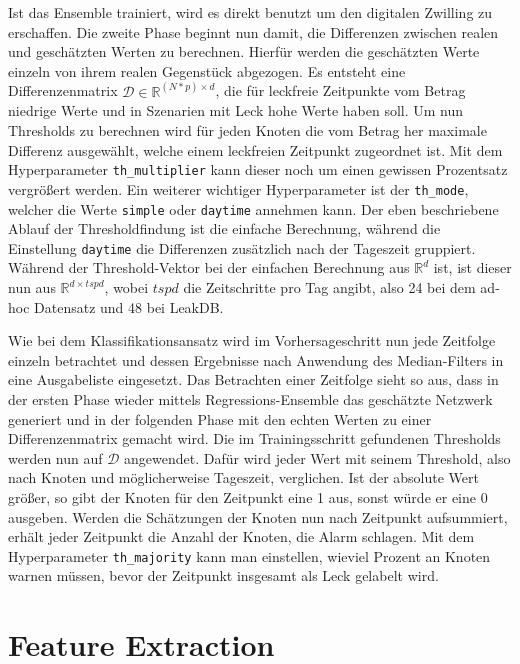 Ist das Ensemble trainiert, wird es direkt benutzt um den digitalen Zwilling zu erschaffen. Die zweite Phase
 beginnt nun damit, die Differenzen zwischen realen und geschätzten Werten zu berechnen. Hierfür werden die
 geschätzten Werte einzeln von ihrem realen Gegenstück abgezogen. Es entsteht eine Differenzenmatrix
 $\mathcal{D} \in \mathbb{R}^{(N*p) \times d}$, die für leckfreie Zeitpunkte vom Betrag niedrige Werte und in
 Szenarien mit Leck hohe Werte haben soll. Um nun Thresholds zu berechnen wird für jeden Knoten die vom Betrag
 her maximale Differenz ausgewählt, welche einem leckfreien Zeitpunkt zugeordnet ist. Mit dem Hyperparameter
 \texttt{th\_multiplier} kann dieser noch um einen gewissen Prozentsatz vergrößert werden. Ein weiterer wichtiger
 Hyperparameter ist der \texttt{th\_mode}, welcher die Werte \texttt{simple} oder \texttt{daytime} annehmen kann.
 Der eben beschriebene Ablauf der Thresholdfindung ist die einfache Berechnung, während die Einstellung
 \texttt{daytime} die Differenzen zusätzlich nach der Tageszeit gruppiert. Während der Threshold-Vektor bei der
 einfachen Berechnung aus $\mathbb{R}^d$ ist, ist dieser nun aus $\mathbb{R}^{d \times tspd}$, wobei $tspd$ die
 Zeitschritte pro Tag angibt, also 24 bei dem ad-hoc Datensatz und 48 bei LeakDB.

Wie bei dem Klassifikationsansatz wird im Vorhersageschritt nun jede Zeitfolge einzeln betrachtet und dessen
 Ergebnisse nach Anwendung des Median-Filters in eine Ausgabeliste eingesetzt. Das Betrachten einer Zeitfolge
 sieht so aus, dass in der ersten Phase wieder mittels Regressions-Ensemble das geschätzte Netzwerk generiert
 und in der folgenden Phase mit den echten Werten zu einer Differenzenmatrix gemacht wird. Die im Trainingsschritt
 gefundenen Thresholds werden nun auf $\mathcal{D}$ angewendet. Dafür wird jeder Wert mit seinem Threshold,
 also nach Knoten und möglicherweise Tageszeit, verglichen. Ist der absolute Wert größer, so gibt der Knoten für
 den Zeitpunkt eine 1 aus, sonst würde er eine 0 ausgeben. Werden die Schätzungen der Knoten nun nach Zeitpunkt
 aufsummiert, erhält jeder Zeitpunkt die Anzahl der Knoten, die Alarm schlagen. Mit dem Hyperparameter
 \texttt{th\_majority} kann man einstellen, wieviel Prozent an Knoten warnen müssen, bevor der Zeitpunkt insgesamt
 als Leck gelabelt wird.

\section{Feature Extraction}


